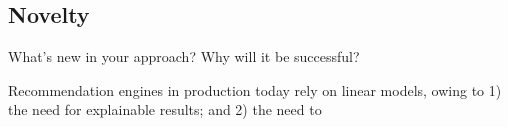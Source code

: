 \subsection{Novelty}
What's new in your approach? Why will it be successful?

Recommendation engines in production today rely on linear models, owing to 1) the need for explainable results; and 2) the need to  